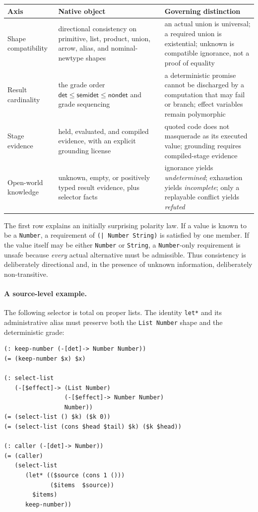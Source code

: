 \documentclass[11pt]{article}
\newcommand{\code}[1]{\texttt{#1}}
\begin{document}
\begin{center}
\begin{tabular}{p{.19\linewidth}p{.34\linewidth}p{.37\linewidth}}
\toprule
Axis & Native object & Governing distinction \\
\midrule
Shape compatibility
  & directional consistency on primitive, list, product, union, arrow,
    alias, and nominal-newtype shapes
  & an actual union is universal; a required union is existential; unknown
    is compatible ignorance, not a proof of equality \\
Result cardinality
  & the grade order $\mathsf{det}\leq\mathsf{semidet}\leq\mathsf{nondet}$
    and grade sequencing
  & a deterministic promise cannot be discharged by a computation that may
    fail or branch; effect variables remain polymorphic \\
Stage evidence
  & held, evaluated, and compiled evidence, with an explicit grounding
    license
  & quoted code does not masquerade as its executed value; grounding requires
    compiled-stage evidence \\
Open-world knowledge
  & unknown, empty, or positively typed result evidence, plus selector facts
  & ignorance yields \emph{undetermined}; exhaustion yields
    \emph{incomplete}; only a replayable conflict yields \emph{refuted} \\
\bottomrule
\end{tabular}
\end{center}

The first row explains an initially surprising polarity law.  If a value is
known to be a \code{Number}, a requirement of
\code{(| Number String)} is satisfied by one member.  If the value itself may
be either \code{Number} or \code{String}, a \code{Number}-only requirement is
unsafe because \emph{every} actual alternative must be admissible.  Thus
consistency is deliberately directional and, in the presence of unknown
information, deliberately non-transitive.

\paragraph{A source-level example.}
The following selector is total on proper lists.  The identity
\code{let*} and its administrative alias must preserve both the
\code{List Number} shape and the deterministic grade:

\begin{lstlisting}
(: keep-number (-[det]-> Number Number))
(= (keep-number $x) $x)

(: select-list
   (-[$effect]-> (List Number)
                 (-[$effect]-> Number Number)
                 Number))
(= (select-list () $k) ($k 0))
(= (select-list (cons $head $tail) $k) ($k $head))

(: caller (-[det]-> Number))
(= (caller)
   (select-list
      (let* (($source (cons 1 ()))
             ($items  $source))
        $items)
      keep-number))
\end{lstlisting}
\end{document}
